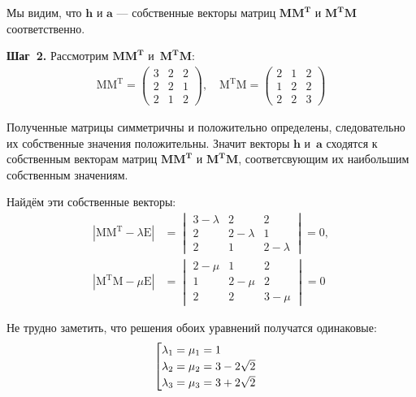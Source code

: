 \documentclass[class=article,crop=false]{standalone}
\makeatletter
\newenvironment{bcases}{%
    \left[
    \renewcommand{\arraystretch}{1.2}%
    \array{@{}l@{\quad}l@{}}
    }
    {\endarray\right.}
\makeatother
\begin{document}
\begin{multicols}{2}
        Мы видим, что $\mathbf{h}$ и $\mathbf{a}$ --- собственные векторы матриц $\mathbf{M M^T}$ и $\mathbf{M^T M}$ соответственно.

        \noindent\textbf{Шаг~2.} Рассмотрим $\mathbf{M M^T}$ и~$\mathbf{M^T M}$:
        \begin{gather*}
            \mathrm{M M^T}=
            \begin{pmatrix}
                3 & 2 & 2 \\
                2 & 2 & 1 \\
                2 & 1 & 2
            \end{pmatrix},
            \quad
            \mathrm{M^T M}=
            \begin{pmatrix}
                2 & 1 & 2 \\
                1 & 2 & 2 \\
                2 & 2 & 3
            \end{pmatrix}
        \end{gather*}

        \noindent Полученные матрицы симметричны и положительно определены, следовательно их собственные значения положительны. Значит векторы $\mathbf{h}$ и~$\mathbf{a}$ сходятся к собственным векторам матриц  $\mathbf{M M^T}$ и $\mathbf{M^T M}$, соответсвующим их наибольшим собственным значениям.
        \vfill\null\columnbreak

        Найдём эти собственные векторы:
        \begin{align*}
            \left|\mathrm{M M^T}-\lambda\mathrm{E}\right| &=
            \begin{vmatrix}
                3-\lambda & 2         & 2         \\
                2         & 2-\lambda & 1         \\
                2         & 1         & 2-\lambda
            \end{vmatrix}=0,\\
            \left|\mathrm{M^T M}-\mu\mathrm{E}\right| &=
            \begin{vmatrix}
                2-\mu & 1     & 2     \\
                1     & 2-\mu & 2     \\
                2     & 2     & 3-\mu
            \end{vmatrix}=0
        \end{align*}

        \noindent Не трудно заметить, что решения обоих уравнений получатся одинаковые:
        \begin{gather*}
            \begin{bcases}
                \lambda_1=\mu_1=1\\
                \lambda_2=\mu_2=3-2\sqrt{2}\\
                \lambda_3=\mu_3=3+2\sqrt{2}
            \end{bcases}
        \end{gather*}


\end{multicols}
\end{document}
